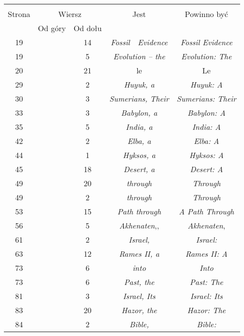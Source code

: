 \documentclass[a4paper,11pt]{article}
\begin{document}
\begin{center}

  \begin{tabular}{|c|c|c|c|c|}
    \hline
    & \multicolumn{2}{c|}{} & & \\
    Strona & \multicolumn{2}{c|}{Wiersz} & Jest
                              & Powinno być \\ \cline{2-3}
    & Od góry & Od dołu & & \\
    \hline
    19  & & 14 & \textit{Fossil~~Evidence} & \textit{Fossil Evidence} \\
    19  & &  5 & \textit{Evolution -- the} & \textit{Evolution: The} \\
    20  & & 21 & le & Le \\
    29  & &  2 & \textit{Huyuk, a} & \textit{Huyuk: A} \\
    30  & &  3 & \textit{Sumerians, Their} & \textit{Sumerians: Their} \\
    33  & &  3 & \textit{Babylon, a} & \textit{Babylon: A} \\
    35  & &  5 & \textit{India, a} & \textit{India: A} \\
    42  & &  2 & \textit{Elba, a} & \textit{Elba: A} \\
    44  & &  1 & \textit{Hyksos, a} & \textit{Hyksos: A} \\
    45  & & 18 & \textit{Desert, a} & \textit{Desert: A} \\
    49  & & 20 & \textit{through} & \textit{Through} \\
    49  & &  2 & \textit{through} & \textit{Through} \\
    53  & & 15 & \textit{Path through} & \textit{A Path Through} \\
    56  & &  5 & \textit{Akhenaten},,  %
           & \textit{Akhenaten}, \\
    61  & &  2 & \textit{Israel,} & \textit{Israel:} \\
    63  & & 12 & \textit{Rames II, a} & \textit{Rames II: A} \\
    73  & &  6 & \textit{into} & \textit{Into} \\
    73  & &  6 & \textit{Past, the} & \textit{Past: The} \\
    81  & &  3 & \textit{Israel, Its} & \textit{Israel: Its} \\
    83  & & 20 & \textit{Hazor, the} & \textit{Hazor: The} \\
    84  & &  2 & \textit{Bible,} & \textit{Bible:} \\

\end{tabular}
\end{center}
\end{document}
